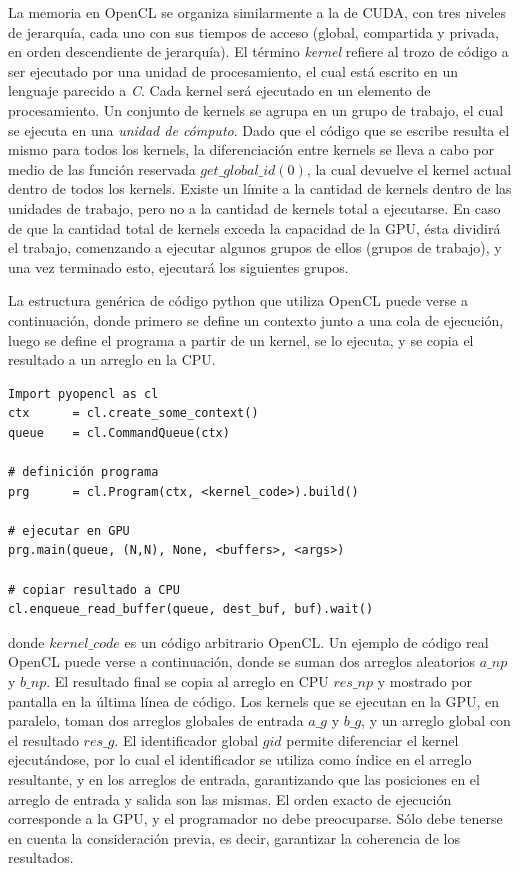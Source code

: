 La memoria en OpenCL se organiza similarmente a la de CUDA, con tres niveles de jerarquía, cada uno con sus tiempos de acceso (global, compartida y privada, en orden descendiente de jerarquía).
El término {\em kernel} refiere al trozo de código a ser ejecutado por una unidad de procesamiento, el cual está escrito en un lenguaje parecido a {\em C}.
Cada kernel será ejecutado en un elemento de procesamiento.
Un conjunto de kernels se agrupa en un grupo de trabajo, el cual se ejecuta en una {\em unidad de cómputo}.
Dado que el código que se escribe resulta el mismo para todos los kernels, la diferenciación entre kernels se lleva a cabo por medio de las función reservada $get\_global\_id(0)$, la cual devuelve el kernel actual dentro de todos los kernels.
Existe un límite a la cantidad de kernels dentro de las unidades de trabajo, pero no a la cantidad de kernels total a ejecutarse.
En caso de que la cantidad total de kernels exceda la capacidad de la GPU, ésta dividirá el trabajo, comenzando a ejecutar algunos grupos de ellos (grupos de trabajo), y una vez terminado esto, ejecutará los siguientes grupos.


La estructura genérica de código python que utiliza OpenCL puede verse a continuación,
donde primero se define un contexto junto a una cola de ejecución, luego se define el programa a partir de un kernel, se lo ejecuta, y se copia el resultado a un arreglo en la CPU.

\begin{verbatim}
Import pyopencl as cl
ctx      = cl.create_some_context()
queue    = cl.CommandQueue(ctx)

# definición programa
prg      = cl.Program(ctx, <kernel_code>).build()

# ejecutar en GPU
prg.main(queue, (N,N), None, <buffers>, <args>) 

# copiar resultado a CPU
cl.enqueue_read_buffer(queue, dest_buf, buf).wait()
\end{verbatim}

donde $kernel\_code$ es un código arbitrario OpenCL.
Un ejemplo de código real OpenCL puede verse a continuación, donde se suman dos arreglos aleatorios $a\_{np}$ y $b\_{np}$. El resultado final se copia al arreglo en CPU $res\_np$ y mostrado por pantalla en la última línea de código.
Los kernels que se ejecutan en la GPU, en paralelo, toman dos arreglos globales de entrada $a\_g$ y $b\_g$, y un arreglo global con el resultado $res\_g$.
El identificador global $gid$ permite diferenciar el kernel ejecutándose, por lo cual el identificador se utiliza como índice en el arreglo resultante, y en los arreglos de entrada, garantizando que las posiciones en el arreglo de entrada y salida son las mismas.
El orden exacto de ejecución corresponde a la GPU, y el programador no debe preocuparse.
Sólo debe tenerse en cuenta la consideración previa, es decir, garantizar la coherencia de los resultados.

